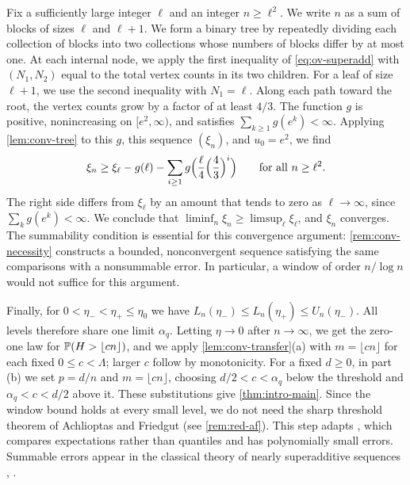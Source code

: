 Fix a sufficiently large integer $\ell$ and an integer $n \ge \ell^2$. We write $n$ as a sum of blocks of sizes $\ell$ and $\ell + 1$. We form a binary tree by repeatedly dividing each collection of blocks into two collections whose numbers of blocks differ by at most one. At each internal node, we apply the first inequality of \eqref{eq:ov-superadd} with $(N_1, N_2)$ equal to the total vertex counts in its two children. For a leaf of size $\ell + 1$, we use the second inequality with $N_1 = \ell$. Along each path toward the root, the vertex counts grow by a factor of at least $4/3$. The function $g$ is positive, nonincreasing on $[e^2, \infty)$, and satisfies $\sum_{k \ge 1}g(e^k) < \infty$. Applying \cref{lem:conv-tree} to this $g$, this sequence $(\xi_n)$, and $u_0 = e^2$, we find
\begin{equation}\label{eq:ov-tree}
\xi_n \ge \xi_\ell - g(\ell) - \sum_{i \ge 1} g\Bigl(\frac{\ell}{4} \Bigl(\frac{4}{3}\Bigr)^i\Bigr) \qquad \text{for all } n \ge \ell^2.
\end{equation}
The right side differs from $\xi_\ell$ by an amount that tends to zero as $\ell \to \infty$, since $\sum_k g(e^k) < \infty$. We conclude that $\liminf_n \xi_n \ge \limsup_\ell \xi_\ell$, and $\xi_n$ converges. The summability condition is essential for this convergence argument: \cref{rem:conv-necessity} constructs a bounded, nonconvergent sequence satisfying the same comparisons with a nonsummable error. In particular, a window of order $n/\log n$ would not suffice for this argument.

Finally, for $0 < \eta_- < \eta_+ \le \eta_0$ we have $L_n(\eta_-) \le L_n(\eta_+) \le U_n(\eta_-)$. All levels therefore share one limit $\alpha_q$. Letting $\eta \to 0$ after $n \to \infty$, we get the zero-one law for $\mathbb P(H > \lfloor cn \rfloor)$, and we apply \cref{lem:conv-transfer}(a) with $m = \lfloor cn\rfloor$ for each fixed $0 \le c < \Lambda$; larger $c$ follow by monotonicity. For a fixed $d \ge 0$, in part (b) we set $p = d/n$ and $m = \lfloor cn\rfloor$, choosing $d/2 < c < \alpha_q$ below the threshold and $\alpha_q < c < d/2$ above it. These substitutions give \cref{thm:intro-main}. Since the window bound holds at every small level, we do not need the sharp threshold theorem of Achlioptas and Friedgut (see \cref{rem:red-af}). This step adapts \cite[Section~5]{openai2026limiting}, which compares expectations rather than quantiles and has polynomially small errors. Summable errors appear in the classical theory of nearly superadditive sequences \cite[Theorem~23]{debruijn1952some}, \cite[arXiv:1006.3786v1, Section~4.3, Lemma~8 and Remark~3]{abbe2014concentration}.

